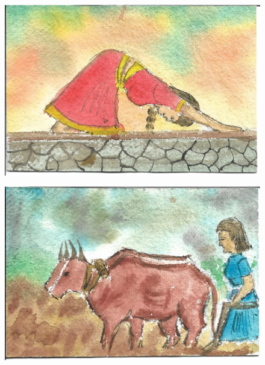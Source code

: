 \documentclass[12pt]{article}
\begin{document}
\begin{figure}[h!]
\centering
\includegraphics[width=.7\paperwidth]{pictures/AE}
\end{figure}

\newpage

\begin{figure}[h!]
\centering
\includegraphics[width=.7\paperwidth]{pictures/LP}
\end{figure}

\newpage
\end{document}
